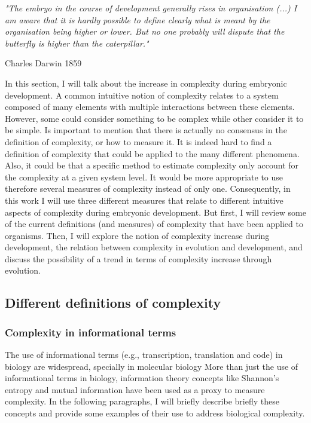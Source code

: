 \setlength{\epigraphrule}{0\p@}
\setlength{\epigraphwidth}{.7\textwidth}
\epigraph{\textit{"The embryo in the course of development generally rises in organisation (...) I am aware that it is hardly possible to define clearly what is meant by the organisation being higher or lower. But no one probably will dispute that the butterfly is higher than the caterpillar."}}{Charles Darwin 1859}

In this section, I will talk about the increase in complexity during embryonic development. A common intuitive notion of complexity relates to a system composed of many elements with multiple interactions between these elements. However, some could consider something to be complex while other consider it to be simple.
Is important to mention that there is actually no consensus in the definition of complexity, or how to measure it.
%
It is indeed hard to find a definition of complexity that could be applied to the many different phenomena. 
%
Also, it could be that a specific method to estimate complexity only account for the complexity at a given system level. It would be more appropriate to use therefore several measures of complexity instead of only one.
Consequently, in this work I will use three different measures that relate to different intuitive aspects of complexity during embryonic development.
But first, I will review some of the current definitions (and measures) of complexity that have been applied to organisms.
Then, I will explore the notion of complexity increase during development, the relation between complexity in evolution and development, and discuss the possibility of a trend in terms of complexity increase through evolution.

\subsection{Different definitions of complexity}


\subsubsection{Complexity in informational terms}

The use of informational terms (e.g., transcription, translation and code) in biology are widespread, specially in molecular biology \citep{Smith2000,yockey2005information}
More than just the use of informational terms in biology, information theory concepts like Shannon's entropy and mutual information have been used as a proxy to measure complexity.
In the following paragraphs, I will briefly describe briefly these concepts and provide some examples of their use to address biological complexity.

